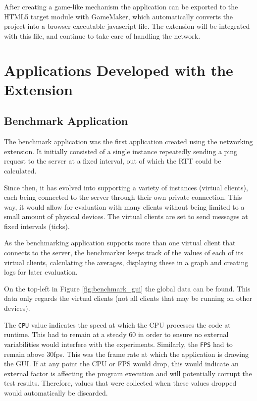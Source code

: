 \documentclass[bsc, 12pt, twoside, singlespacing, parskip, abbrevs, notimes, normalheadings, logo, deptreport]{styles/infthesis}
\begin{document}
After creating a game-like mechanism the application can be exported to the HTML5 target module with GameMaker, which automatically converts the project into a browser-executable javascript file. The extension will be integrated with this file, and continue to take care of handling the network.

\section{Applications Developed with the Extension}
\subsection{Benchmark Application}
The benchmark application was the first application created using the networking extension. It initially consisted of a single instance repeatedly sending a ping request to the server at a fixed interval, out of which the RTT could be calculated.

Since then, it has evolved into supporting a variety of instances (virtual clients), each being connected to the server through their own private connection. This way, it would allow for evaluation with many clients without being limited to a small amount of physical devices. The virtual clients are set to send messages at fixed intervals (ticks).

As the benchmarking application supports more than one virtual client that connects to the server, the benchmarker keeps track of the values of each of its virtual clients, calculating the averages, displaying these in a graph and creating logs for later evaluation.

On the top-left in Figure \ref{fig:benchmark_gui} the global data can be found. This data only regards the virtual clients (not all clients that may be running on other devices). 

The \texttt{CPU} value indicates the speed at which the CPU processes the code at runtime. This had to remain at a steady 60 in order to ensure no external variabilities would interfere with the experiments. Similarly, the \texttt{FPS} had to remain above 30fps. This was the frame rate at which the application is drawing the GUI. If at any point the CPU or FPS would drop, this would indicate an external factor is affecting the program execution and will potentially corrupt the test results. Therefore, values that were collected when these values dropped would automatically be discarded.
\end{document}
